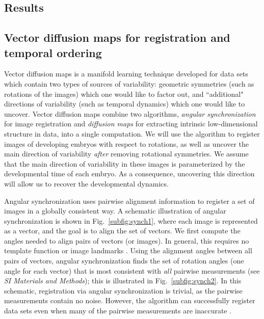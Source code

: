 \documentclass{pnastwo}
\newcommand{\SI}[0]{{\it SI Materials and Methods}}
\newcommand{\fig}[0]{Fig.}
\begin{document}
\begin{article}
\section{Results}

\subsection{Vector diffusion maps for registration and temporal ordering}

Vector diffusion maps \cite{singer2012vector} is a manifold learning
technique developed for data sets which contain two types of sources of variability:
geometric symmetries (such as rotations of the images) which one would like to factor out,
and ``additional" directions of variability (such as temporal dynamics) which one would like to uncover.
%
Vector diffusion maps combine two algorithms, {\em angular synchronization} \cite{singer2011angular} for image registration and {\em diffusion maps} \cite{coifman2005geometric} for extracting intrinsic low-dimensional structure in data, into a single computation.
%
We will use the algorithm to register images of developing embryos with respect to rotations, as well as uncover the main direction of variability {\it after} removing rotational symmetries.
%
We assume that the main direction of variability in these images is parameterized by the developmental time of each embryo.
%
As a consequence, uncovering this direction will allow us to recover the developmental dynamics.

Angular synchronization uses pairwise alignment information to register a set of images in a globally consistent way.
%
A schematic illustration of angular synchronization is shown in \fig~\ref{subfig:synch1}, where each image is represented as a vector, and the goal is to align the set of vectors.
%
We first compute the angles needed to align pairs of vectors (or images).  
%
In general, this requires no template function \cite{ahuja2007template} or image landmarks \cite{ian1998statistical}.
%
Using the alignment angles between all pairs of vectors, angular synchronization finds the set of rotation angles (one angle for each vector) that is most consistent with {\it all} pairwise measurements (see \SI); this is illustrated in \fig~\ref{subfig:synch2}.
%
In this schematic, registration via angular synchronization is trivial, as the pairwise measurements contain no noise.
%
However, the algorithm can successfully register data sets even when many of the pairwise measurements are inaccurate \cite{singer2011angular}.


\end{article}
\end{document}
